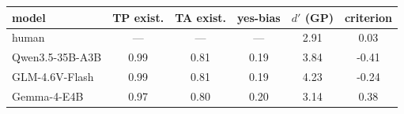 \begin{tabular}{lccccc}
\toprule
model & TP exist. & TA exist. & yes-bias & $d'$ (GP) & criterion \\
\midrule
human & --- & --- & --- & 2.91 & 0.03 \\
Qwen3.5-35B-A3B & 0.99 & 0.81 & 0.19 & 3.84 & -0.41 \\
GLM-4.6V-Flash & 0.99 & 0.81 & 0.19 & 4.23 & -0.24 \\
Gemma-4-E4B & 0.97 & 0.80 & 0.20 & 3.14 & 0.38 \\
\bottomrule
\end{tabular}
